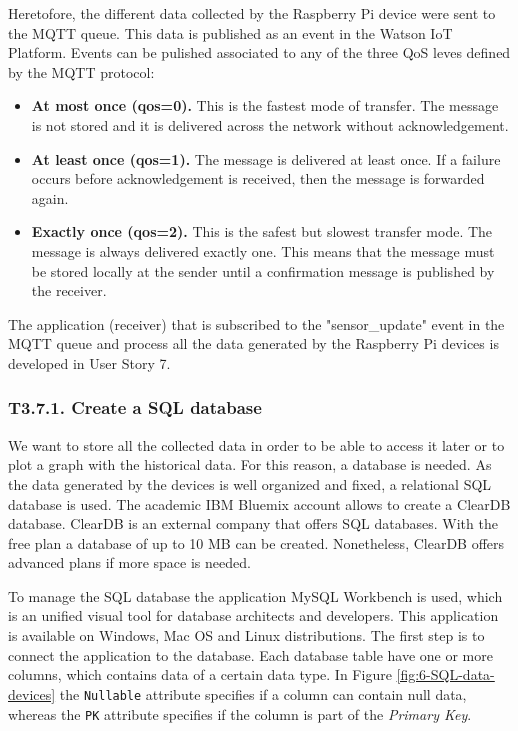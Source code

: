 Heretofore, the different data collected by the Raspberry Pi device were sent to the MQTT queue. This data is published as an event in the Watson \ac{IoT} Platform. Events can be pulished associated to any of the three \ac{QoS} leves defined by the MQTT protocol:
\begin{itemize}
	\item \textbf{At most once (qos=0).} This is the fastest mode of transfer. The message is not stored and it is delivered across the network without acknowledgement.
	\item \textbf{At least once (qos=1).} The message is delivered at least once. If a failure occurs before acknowledgement is received, then the message is forwarded again.
	\item \textbf{Exactly once (qos=2).} This is the safest but slowest transfer mode. The message is always delivered exactly one. This means that the message must be stored locally at the sender until a confirmation message is published by the receiver.
\end{itemize}

The application (receiver) that is subscribed to the "sensor\_update" event in the MQTT queue and process all the data generated by the Raspberry Pi devices is developed in User Story 7.


\subsubsection{T3.7.1. Create a SQL database}

We want to store all the collected data in order to be able to access it later or to plot a graph with the historical data. For this reason, a database is needed. As the data generated by the devices is well organized and fixed, a relational SQL database is used. The academic IBM Bluemix account allows to create a ClearDB database. ClearDB is an external company that offers SQL databases. With the free plan a database of up to 10 MB can be created. Nonetheless, ClearDB offers advanced plans if more space is needed.

To manage the SQL database the application MySQL Workbench is used, which is an unified visual tool for database architects and developers. This application is available on Windows, Mac OS and Linux distributions. The first step is to connect the application to the database. Each database table have one or more columns, which contains data of a certain data type. In Figure \ref{fig:6-SQL-data-devices} the \texttt{Nullable} attribute specifies if a column can contain null data, whereas the \texttt{PK} attribute specifies if the column is part of the \textit{Primary Key}.

